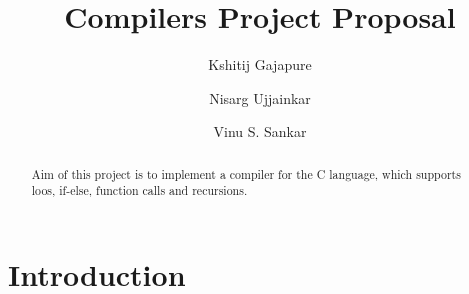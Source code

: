 \documentclass{clv3}
\author{Kshitij Gajapure}
\affil{16110055}
\author{Nisarg Ujjainkar}
\affil{16110102}
\author{Vinu S. Sankar}
\affil{16110xxx}
\title{Compilers Project Proposal}
\begin{document}
    \maketitle  
    \begin{abstract}
        Aim of this project is to implement a compiler for the 
        C language, which supports loos, if-else, function calls 
        and recursions.
    \end{abstract}
    \section{Introduction}
    
\end{document}

